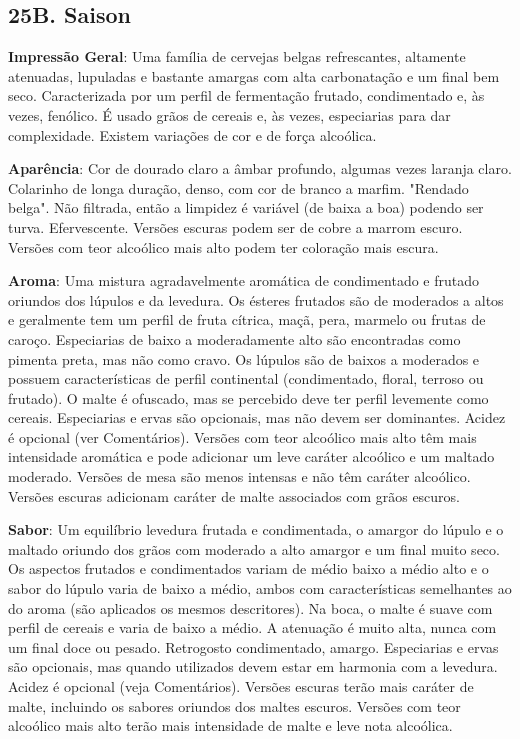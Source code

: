 \subsection*{25B. Saison}
\textbf{Impressão Geral}: Uma família de cervejas belgas refrescantes, altamente atenuadas, lupuladas e bastante amargas com alta carbonatação e um final bem seco. Caracterizada por um perfil de fermentação frutado, condimentado e, às vezes, fenólico. É usado grãos de cereais e, às vezes, especiarias para dar complexidade. Existem variações de cor e de força alcoólica.

\textbf{Aparência}: Cor de dourado claro a âmbar profundo, algumas vezes laranja claro. Colarinho de longa duração, denso, com cor de branco a marfim. "Rendado belga". Não filtrada, então a limpidez é variável (de baixa a boa) podendo ser turva. Efervescente. Versões escuras podem ser de cobre a marrom escuro. Versões com teor alcoólico mais alto podem ter coloração mais escura.

\textbf{Aroma}: Uma mistura agradavelmente aromática de condimentado e frutado oriundos dos lúpulos e da levedura. Os ésteres frutados são de moderados a altos e geralmente tem um perfil de fruta cítrica, maçã, pera, marmelo ou frutas de caroço. Especiarias de baixo a moderadamente alto são encontradas como pimenta preta, mas não como cravo. Os lúpulos são de baixos a moderados e possuem características de perfil continental (condimentado, floral, terroso ou frutado). O malte é ofuscado, mas se percebido deve ter perfil levemente como cereais. Especiarias e ervas são opcionais, mas não devem ser dominantes. Acidez é opcional (ver Comentários). Versões com teor alcoólico mais alto têm mais intensidade aromática e pode adicionar um leve caráter alcoólico e um maltado moderado. Versões de mesa são menos intensas e não têm caráter alcoólico. Versões escuras adicionam caráter de malte associados com grãos escuros.

\textbf{Sabor}: Um equilíbrio levedura frutada e condimentada, o amargor do lúpulo e o maltado oriundo dos grãos com moderado a alto amargor e um final muito seco. Os aspectos frutados e condimentados variam de médio baixo a médio alto e o sabor do lúpulo varia de baixo a médio, ambos com características semelhantes ao do aroma (são aplicados os mesmos descritores). Na boca, o malte é suave com perfil de cereais e varia de baixo a médio. A atenuação é muito alta, nunca com um final doce ou pesado. Retrogosto condimentado, amargo. Especiarias e ervas são opcionais, mas quando utilizados devem estar em harmonia com a levedura. Acidez é opcional (veja Comentários). Versões escuras terão mais caráter de malte, incluindo os sabores oriundos dos maltes escuros. Versões com teor alcoólico mais alto terão mais intensidade de malte e leve nota alcoólica.

